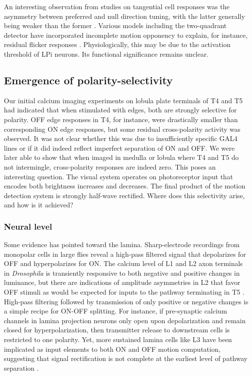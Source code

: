 An interesting observation from studies on tangential cell responses was the asymmetry between preferred and null direction tuning, with the latter generally being weaker than the former \citep{Egelhaaf:1989wf,Joesch:2008fo}. Various models including the two-quadrant detector have incorporated incomplete motion opponency to explain, for instance, residual flicker responses \citep{Eichner:2011ic}. Physiologically, this may be due to the activation threshold of LPi neurons. Its functional significance remains unclear.


\subsection{Emergence of polarity-selectivity}
Our initial calcium imaging experiments on lobula plate terminals of T4 and T5 had indicated that when stimulated with edges, both are strongly selective for polarity. OFF edge responses in T4, for instance, were drastically smaller than corresponding ON edge responses, but some residual cross-polarity activity was observed. It was not clear whether this was due to insufficiently specific GAL4 lines or if it did indeed reflect imperfect separation of ON and OFF. We were later able to show that when imaged in medulla or lobula where T4 and T5 do not intermingle, cross-polarity responses are indeed zero. This poses an interesting question. The visual system operates on photoreceptor input that encodes both brightness increases and decreases. The final product of the motion detection system is strongly half-wave rectified. Where does this selectivity arise, and how is it achieved?

\subsubsection{Neural level}
Some evidence has pointed toward the lamina. Sharp-electrode recordings from monopolar cells in large flies reveal a high-pass filtered signal that depolarizes for OFF and hyperpolarizes for ON. The calcium level of L1 and L2 axon terminals in \textit{Drosophila} is transiently responsive to both negative and positive changes in luminance, but there are indications of amplitude asymmetries in L2 that favor OFF stimuli as would be expected for inputs to the pathway terminating in T5 \citep{Reiff:2010eo,Clark:2011gw}. High-pass filtering followed by transmission of only positive or negative changes is a simple recipe for ON-OFF splitting. For instance, if pre-synaptic calcium channels in lamina projection neurons only open upon depolarization and remain closed for hyperpolarization, then transmitter release to downstream cells is restricted to one polarity. Yet, more sustained lamina cells like L3 have been implicated as input elements to both ON and OFF motion computation, suggesting that signal rectification is not complete at the earliest level of pathway separation \citep{Silies:2013jp,Takemura:2017aa}.

